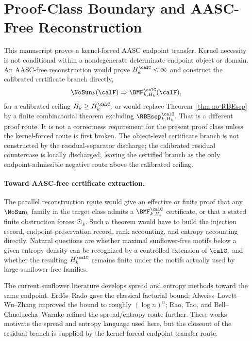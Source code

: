 \documentclass[11pt]{article}
\begin{document}
\section{Proof-Class Boundary and AASC-Free Reconstruction}

This manuscript proves a kernel-forced AASC endpoint transfer.  Kernel necessity is not conditional within a nondegenerate determinate endpoint object or domain.  An AASC-free reconstruction would prove \(H_k^{\calC}<\infty\) and construct the calibrated certificate branch directly,
\[
  \NoSun_k(\calF)\Rightarrow \BMF^{\calC}_{k,H_k}(\calF),
\]
for a calibrated ceiling \(H_k\ge H_k^{\calC}\), or would replace Theorem~\ref{thm:no-RBEsep} by a finite combinatorial theorem excluding \(\RBEsep^{\calC}_{k,H_k}\).  That is a different proof route.  It is not a correctness requirement for the present proof class unless the kernel-forced route is first broken.  The object-level certificate branch is not constructed by the residual-separator discharge; the calibrated residual countercase is locally discharged, leaving the certified branch as the only endpoint-admissible negative route above the calibrated ceiling.

\paragraph{Toward AASC-free certificate extraction.}
The parallel reconstruction route would give an effective or finite proof that any \(\NoSun_k\) family in the target class admits a \(\BMF^{\calC}_{k,H_k}\) certificate, or that a stated finite obstruction forces \(\Sun_k\).  Such a theorem would have to build the injection record, endpoint-preservation record, rank accounting, and entropy accounting directly.  Natural questions are whether maximal sunflower-free motifs below a given entropy density can be recognized by a controlled extension of \(\calC\), and whether the resulting \(H_k^{\calC}\) remains finite under the motifs actually used by large sunflower-free families.

The current sunflower literature develops spread and entropy methods toward the same endpoint.  Erdős--Rado gave the classical factorial bound; Alweiss--Lovett--Wu--Zhang improved the bound to roughly \((\log n)^n\); Rao, Tao, and Bell--Chueluecha--Warnke refined the spread/entropy route further.  These works motivate the spread and entropy language used here, but the closeout of the residual branch is supplied by the kernel-forced endpoint-transfer route.
\end{document}
